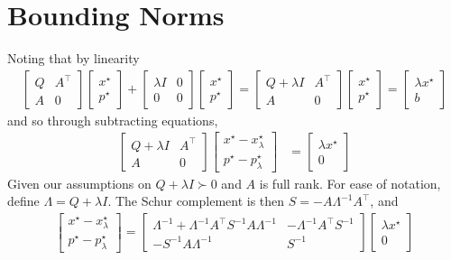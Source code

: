 \documentclass[12pt]{article}
\begin{document}
\section{Bounding Norms}
Noting that by linearity
\begin{align*}
  \begin{bmatrix} Q & A^\top \\ A & 0 \end{bmatrix}
    \begin{bmatrix} x^\star \\ p^\star \end{bmatrix}
  + \begin{bmatrix} \lambda I & 0 \\ 0 & 0 \end{bmatrix}
    \begin{bmatrix} x^\star \\ p^\star \end{bmatrix}
  = \begin{bmatrix} Q + \lambda I & A^\top \\ A & 0 \end{bmatrix}
    \begin{bmatrix} x^\star \\ p^\star \end{bmatrix}
  = \begin{bmatrix} \lambda x^\star \\ b \end{bmatrix}
\end{align*}
and so through subtracting equations,
\begin{align*}
  \begin{bmatrix} Q + \lambda I & A^\top \\ A & 0 \end{bmatrix}
    \begin{bmatrix}
      x^\star - x_{\lambda} ^\star \\ p^\star - p_\lambda ^\star
    \end{bmatrix}
    &= \begin{bmatrix} \lambda x^\star \\ 0 \end{bmatrix}
\end{align*}
Given our assumptions on \(Q + \lambda I \succ 0\) and \(A\) is full rank.
For ease of notation, define \(\Lambda = Q + \lambda I\).
The Schur complement is then
\(S = - A \Lambda^{-1} A^\top\), and
\begin{align*}
  \begin{bmatrix}
    x^\star - x_\lambda ^\star \\ p^\star - p_\lambda ^\star \end{bmatrix}
  = \begin{bmatrix}
      \Lambda^{-1} + \Lambda^{-1} A^\top S^{-1} A \Lambda^{-1}
        & - \Lambda^{-1} A^\top S^{-1} \\
      - S^{-1} A \Lambda^{-1} & S^{-1}
    \end{bmatrix}
    \begin{bmatrix}
      \lambda x^\star \\ 0
    \end{bmatrix}
\end{align*}
\end{document}
